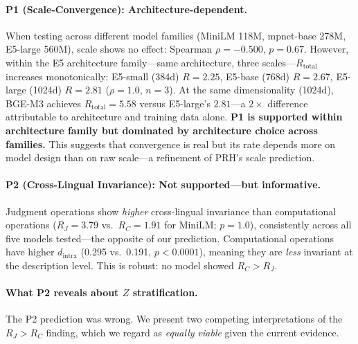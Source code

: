 \documentclass{article}
\theoremstyle{definition}
\begin{document}
\paragraph{P1 (Scale-Convergence): Architecture-dependent.}
When testing across different model families (MiniLM 118M, mpnet-base 278M, E5-large 560M), scale shows no effect: Spearman $\rho = -0.500$, $p = 0.67$. However, within the E5 architecture family---same architecture, three scales---$R_{\text{total}}$ increases monotonically: E5-small (384d) $R = 2.25$, E5-base (768d) $R = 2.67$, E5-large (1024d) $R = 2.81$ ($\rho = 1.0$, $n = 3$). At the same dimensionality (1024d), BGE-M3 achieves $R_{\text{total}} = 5.58$ versus E5-large's $2.81$---a $2\times$ difference attributable to architecture and training data alone. \textbf{P1 is supported within architecture family but dominated by architecture choice across families.} This suggests that convergence is real but its rate depends more on model design than on raw scale---a refinement of PRH's scale prediction.

\paragraph{P2 (Cross-Lingual Invariance): Not supported---but informative.}
Judgment operations show \emph{higher} cross-lingual invariance than computational operations ($R_J = 3.79$ vs.\ $R_C = 1.91$ for MiniLM; $p=1.0$), consistently across all five models tested---the opposite of our prediction. Computational operations have higher $d_{\text{intra}}$ (0.295 vs.\ 0.191, $p < 0.0001$), meaning they are \emph{less} invariant at the description level. This is robust: no model showed $R_C > R_J$.

\paragraph{What P2 reveals about $Z$ stratification.}
The P2 prediction was wrong. We present two competing interpretations of the $R_J > R_C$ finding, which we regard as \emph{equally viable} given the current evidence.
\end{document}
